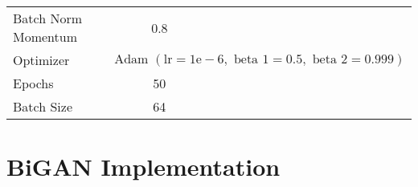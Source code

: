 \begin{longtable}[c]{@{}lccccc@{}}
	Batch Norm Momentum & 0.8 & \multicolumn{1}{l}{} & \multicolumn{1}{l}{} & \multicolumn{1}{l}{} & \multicolumn{1}{l}{} \\
	Optimizer & \multicolumn{5}{l}{$\text { Adam }(\mathrm{lr}=1 \mathrm{e}-6, \text { beta } 1=0.5, \text { beta } 2=0.999)$} \\ \hline
	Epochs & 50 & \multicolumn{1}{l}{} & \multicolumn{1}{l}{} & \multicolumn{1}{l}{} & \multicolumn{1}{l}{} \\
	Batch Size & 64 & \multicolumn{1}{l}{} & \multicolumn{1}{l}{} & \multicolumn{1}{l}{} & \multicolumn{1}{l}{} \\ \hline
\end{longtable}

\section{BiGAN Implementation}
\label{app:bigan}

